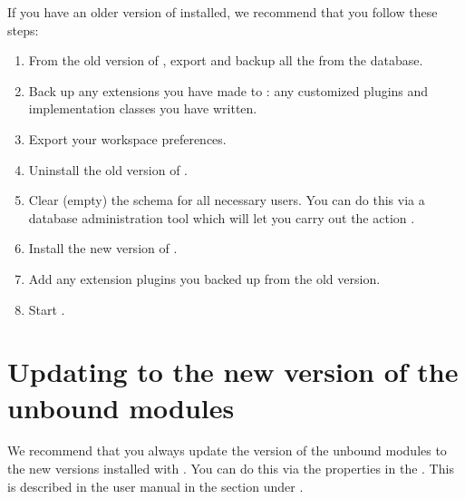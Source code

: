 If you have an older version of \app{} installed, we recommend that you follow these steps:

\begin{enumerate}
\item From the old version of \app{}, export and backup all the \gdprojects{} from the database. 
\item Back up any extensions you have made to \app{}: any customized plugins and implementation classes you have written.  
\item Export your workspace preferences.
\item Uninstall the old version of \app{}. 
\item Clear (empty) the \gddb{} schema for all necessary \app{} users. You can do this via a database administration tool which will let you carry out the action . 
\item Install the new version of \app{}.
\item Add any extension plugins you backed up from the old version.
\item Start \app{}.  

\end{enumerate}

\section{Updating to the new version of the unbound modules}
We recommend that you always update the version of the unbound modules \gdprojects{} to the new versions installed with \app{}. You can do this via the \gdproject{} properties in the \ite{}. This is described in the user manual in the  section under \bxname{\gdprojects{}}. 

